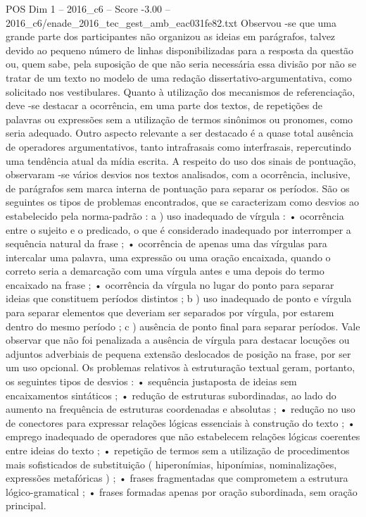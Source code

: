 \begin{textsample}{POS Dim 1 – 2016\_c6 – Score -3.00 – 2016\_c6/enade\_2016\_tec\_gest\_amb\_eac031fe82.txt}
Observou -se que uma grande parte dos participantes não organizou as ideias em parágrafos, talvez devido ao pequeno número de linhas disponibilizadas para a resposta da questão ou, quem sabe, pela suposição de que não seria necessária essa divisão por não se tratar de um texto no modelo de uma redação dissertativo-argumentativa, como solicitado nos vestibulares.
Quanto à utilização dos mecanismos de referenciação, deve -se destacar a ocorrência, em uma parte dos textos, de repetições de palavras ou expressões sem a utilização de termos sinônimos ou pronomes, como seria adequado.
Outro aspecto relevante a ser destacado é a quase total ausência de operadores argumentativos, tanto intrafrasais como interfrasais, repercutindo uma tendência atual da mídia escrita.
A respeito do uso dos sinais de pontuação, observaram -se vários desvios nos textos analisados, com a ocorrência, inclusive, de parágrafos sem marca interna de pontuação para separar os períodos.
São os seguintes os tipos de problemas encontrados, que se caracterizam como desvios ao estabelecido pela norma-padrão : a ) uso inadequado de vírgula : • ocorrência entre o sujeito e o predicado, o que é considerado inadequado por interromper a sequência natural da frase ; • ocorrência de apenas uma das vírgulas para intercalar uma palavra, uma expressão ou uma oração encaixada, quando o correto seria a demarcação com uma vírgula antes e uma depois do termo encaixado na frase ; • ocorrência da vírgula no lugar do ponto para separar ideias que constituem períodos distintos ; b ) uso inadequado de ponto e vírgula para separar elementos que deveriam ser separados por vírgula, por estarem dentro do mesmo período ; c ) ausência de ponto final para separar períodos.
Vale observar que não foi penalizada a ausência de vírgula para destacar locuções ou adjuntos adverbiais de pequena extensão deslocados de posição na frase, por ser um uso opcional.
Os problemas relativos à estruturação textual geram, portanto, os seguintes tipos de desvios : • sequência justaposta de ideias sem encaixamentos sintáticos ; • redução de estruturas subordinadas, ao lado do aumento na frequência de estruturas coordenadas e absolutas ; • redução no uso de conectores para expressar relações lógicas essenciais à construção do texto ; • emprego inadequado de operadores que não estabelecem relações lógicas coerentes entre ideias do texto ; • repetição de termos sem a utilização de procedimentos mais sofisticados de substituição ( hiperonímias, hiponímias, nominalizações, expressões metafóricas ) ; • frases fragmentadas que comprometem a estrutura lógico-gramatical ; • frases formadas apenas por oração subordinada, sem oração principal.

\end{textsample}
